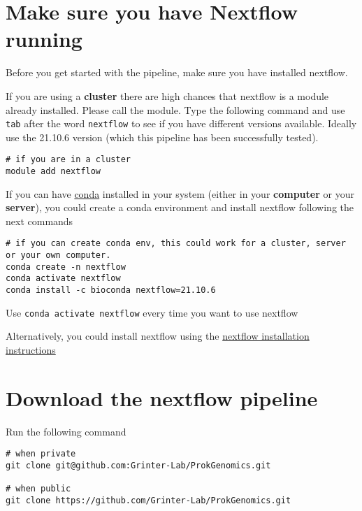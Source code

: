 \documentclass[
]{book}
\begin{document}
\hypertarget{make-sure-you-have-nextflow-running}{%
\section{Make sure you have Nextflow running}\label{make-sure-you-have-nextflow-running}}

Before you get started with the pipeline, make sure you have installed nextflow.

If you are using a \textbf{cluster} there are high chances that nextflow is a module already installed. Please call the module. Type the following command and use \texttt{tab} after the word \texttt{nextflow} to see if you have different versions available. Ideally use the 21.10.6 version (which this pipeline has been successfully tested).

\begin{verbatim}
# if you are in a cluster
module add nextflow
\end{verbatim}

If you can have \href{https://conda.io/projects/conda/en/latest/user-guide/getting-started.html}{conda} installed in your system (either in your \textbf{computer} or your \textbf{server}), you could create a conda environment and install nextflow following the next commands

\begin{verbatim}
# if you can create conda env, this could work for a cluster, server or your own computer. 
conda create -n nextflow
conda activate nextflow
conda install -c bioconda nextflow=21.10.6

\end{verbatim}

Use \texttt{conda\ activate\ nextflow} every time you want to use nextflow

Alternatively, you could install nextflow using the \href{https://www.nextflow.io/docs/latest/getstarted.html}{nextflow installation instructions}

\hypertarget{download-the-nextflow-pipeline}{%
\section{Download the nextflow pipeline}\label{download-the-nextflow-pipeline}}

Run the following command

\begin{verbatim}
# when private
git clone git@github.com:Grinter-Lab/ProkGenomics.git

# when public
git clone https://github.com/Grinter-Lab/ProkGenomics.git
\end{verbatim}
\end{document}
